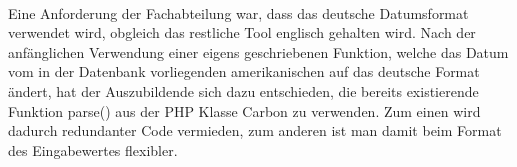     \vspace{0.5cm}\\
    Eine Anforderung der Fachabteilung war, dass das deutsche Datumsformat verwendet wird, obgleich das restliche Tool englisch gehalten wird. Nach der anfänglichen Verwendung einer eigens geschriebenen Funktion, welche das Datum vom in der Datenbank vorliegenden amerikanischen auf das deutsche Format ändert, hat der Auszubildende sich dazu entschieden, die bereits existierende Funktion \glqq parse()\grqq{} aus der PHP Klasse \glqq Carbon\grqq{} zu verwenden. Zum einen wird dadurch redundanter Code vermieden, zum anderen ist man damit beim Format des Eingabewertes flexibler.

